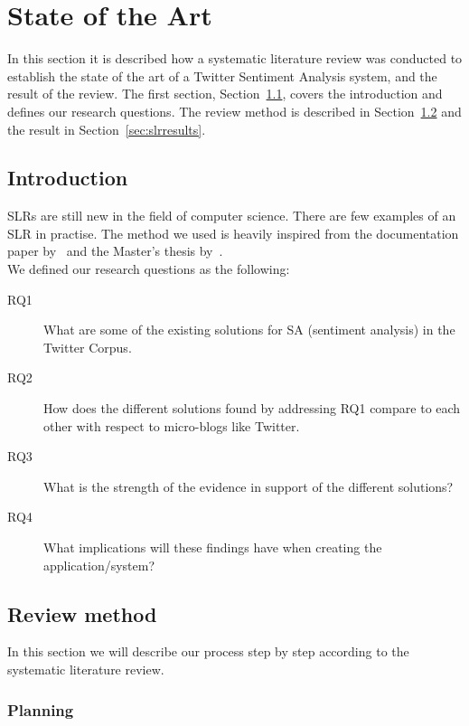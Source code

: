 \chapter{State of the Art}

In this section it is described how a systematic literature review was conducted to establish the state of the art of a Twitter Sentiment Analysis system, and the result of the review. The first section, Section~\ref{sec:slrintro}, covers the introduction and defines our research questions. The review method is described in Section~\ref{sec:slrmethod} and the result in Section~\ref{sec:slrresults}.

\section{Introduction}
\label{sec:slrintro}

SLRs are still new in the field of computer science. There are few examples of an SLR in practise. The method we used is heavily inspired from the documentation paper by~\cite{paper:slrdesc} and the Master's thesis by~\cite{master:slr}. \\

\noindent We defined our research questions as the following:

\begin{description}

\item[RQ1] What are some of the existing solutions for SA (sentiment analysis) in the Twitter Corpus.
\item[RQ2] How does the different solutions found by addressing RQ1 compare to each other with respect to micro-blogs like Twitter.
\item[RQ3] What is the strength of the evidence in support of the different solutions?
\item[RQ4] What implications will these findings have when creating the application/system?

\end{description}

\section{Review method}
\label{sec:slrmethod}

In this section we will describe our process step by step according to the systematic literature review. 

\subsection{Planning}

